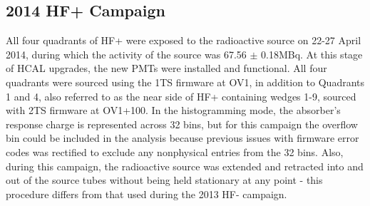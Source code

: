
\subsection{2014 HF+ Campaign}
All four quadrants of HF+ were exposed to the radioactive source on 22-27 April
2014, during which the activity of the source was 67.56 $\pm$ 0.18\unit{MBq}.
At this stage of HCAL upgrades, the new PMTs were installed and functional.
All four quadrants were sourced using the 1TS firmware at OV1, in addition to
Quadrants 1 and 4, also referred to as the near side of HF+ containing wedges
1-9, sourced with 2TS firmware at OV1+100. In the histogramming mode, the
absorber's response charge is represented across 32 bins, but for this campaign
the overflow bin could be included in the analysis because previous issues with
firmware error codes was rectified to exclude any nonphysical entries from the
32 bins. Also, during this campaign, the radioactive source was extended and
retracted into and out of the source tubes without being held stationary at any
point - this procedure differs from that used during the 2013 HF- campaign.


